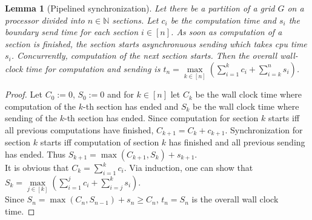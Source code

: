 \documentclass{IOS-Book-Article}
\theoremstyle{plain}
\newtheorem{lemma}[theorem]{Lemma}
\theoremstyle{definition}
\begin{document}
\begin{lemma}[Pipelined synchronization]
	Let there be a partition of a grid $G$ on a processor divided into $n \in \mathbb N$ sections. Let $c_i$ be the computation time and $s_i$ the boundary send time for each section $i \in [n]$. As soon as computation of a section is finished, the section starts asynchronuous sending which takes cpu time $s_i$. Concurrently, computation of the next section starts. Then the overall wall-clock time for computation and sending is $t_n = \max \limits_{k \in [n]} \left( \sum \limits_{i = 1}^{k} c_i + \sum \limits_{i = k}^{n} s_i \right)$.
\end{lemma}

\begin{proof}
	Let $C_0 := 0$, $S_0 := 0$ and for $k \in [n]$ let $C_k$ be the wall clock time where computation of the $k$-th section has ended and $S_k$ be the wall clock time where sending of the $k$-th section has ended. Since computation for section $k$ starts iff all previous computations have finished, $C_{k + 1} = C_k + c_{k + 1}$. Synchronization for section $k$ starts iff computation of section $k$ has finished and all previous sending has ended. Thus $S_{k + 1} = \max(C_{k + 1}, S_k) + s_{k + 1}$.\\
	It is obvious that $C_k = \sum \limits_{i = 1}^{k} c_i$. Via induction, one can show that $S_k = \max \limits_{j \in [k]} \left( \sum \limits_{i = 1}^{j} c_i + \sum \limits_{i = j}^{k} s_i \right)$.\\
	Since $S_n = \max(C_n, S_{n - 1}) + s_n \geq C_n$, $t_n = S_n$ is the overall wall clock time.
\end{proof}
\end{document}
